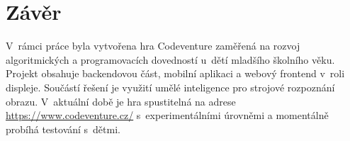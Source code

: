 \chapter{Závěr}

V~rámci práce byla vytvořena hra Codeventure zaměřená na rozvoj algoritmických a programovacích dovedností u~dětí mladšího školního věku. Projekt obsahuje backendovou část, mobilní aplikaci a webový frontend v~roli displeje. Součástí řešení je využití umělé inteligence pro strojové rozpoznání obrazu. V~aktuální době je hra spustitelná na adrese \url{https://www.codeventure.cz/} s~experimentálními úrovněmi a momentálně probíhá testování s~dětmi.